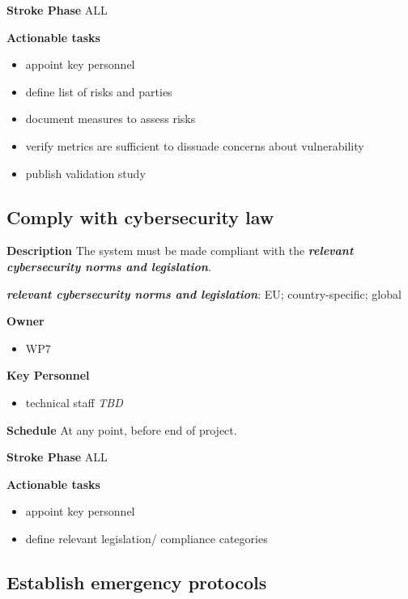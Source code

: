 \documentclass[
  letterpaper,
  DIV=11,
  numbers=noendperiod]{scrreport}
\providecommand{\tightlist}{%
  \setlength{\itemsep}{0pt}\setlength{\parskip}{0pt}}\usepackage{longtable,booktabs,array}
\begin{document}
\textbf{Stroke Phase} ALL

\textbf{Actionable tasks}

\begin{itemize}
\tightlist
\item
  appoint key personnel
\item
  define list of risks and parties
\item
  document measures to assess risks
\item
  verify metrics are sufficient to dissuade concerns about vulnerability
\item
  publish validation study
\end{itemize}

\hypertarget{comply-with-cybersecurity-law}{%
\subsection{Comply with cybersecurity
law}\label{comply-with-cybersecurity-law}}

\textbf{Description} The system must be made compliant with the
\textbf{\emph{relevant cybersecurity norms and legislation}}.

\textbf{\emph{relevant cybersecurity norms and legislation}}: EU;
country-specific; global

\textbf{Owner}

\begin{itemize}
\tightlist
\item
  WP7
\end{itemize}

\textbf{Key Personnel}

\begin{itemize}
\tightlist
\item
  technical staff \emph{TBD}
\end{itemize}

\textbf{Schedule} At any point, before end of project.

\textbf{Stroke Phase} ALL

\textbf{Actionable tasks}

\begin{itemize}
\tightlist
\item
  appoint key personnel
\item
  define relevant legislation/ compliance categories
\end{itemize}

\hypertarget{establish-emergency-protocols}{%
\subsection{Establish emergency
protocols}\label{establish-emergency-protocols}}
\end{document}

